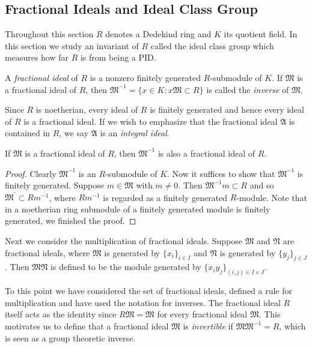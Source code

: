 \subsection{Fractional Ideals and Ideal Class Group}
Throughout this section $R$ denotes a Dedekind ring and $K$ its quotient field. In this section we study an invariant of $R$ called the ideal class group which measures how far $R$ is from being a PID.
\begin{definition}
A \textit{fractional ideal} of $R$ is a nonzero finitely generated $R$-submodule of $K$. If $\mathfrak{M}$ is a fractional ideal of $R$, then $\mathfrak{M}^{-1}=\{x\in K:x\mathfrak{M}\subset R\}$ is called the \textit{inverse} of $\mathfrak{M}$.
\end{definition}
Since $R$ is noetherian, every ideal of $R$ is finitely generated and hence every ideal of $R$ is a fractional ideal. If we wish to emphasize that the fractional ideal $\mathfrak{A}$ is contained in $R$, we say $\mathfrak{A}$ is an \textit{integral ideal}.
\begin{proposition}
If $\mathfrak{M}$ is a fractional ideal of $R$, then $\mathfrak{M}^{-1}$ is also a fractional ideal of $R$.
\end{proposition}
\begin{proof}
Clearly $\mathfrak{M}^{-1}$ is an $R$-submodule of $K$. Now it suffices to show that $\mathfrak{M}^{-1}$ is finitely generated. Suppose $m\in\mathfrak{M}$ with $m\ne 0$. Then $\mathfrak{M}^{-1}m\subset R$ and so $\mathfrak{M}^\prime\subset Rm^{-1}$, where $Rm^{-1}$ is regarded as a finitely generated $R$-module. Note that in a noetherian ring submodule of a finitely generated module is finitely generated, we finished the proof.
\end{proof}
Next we consider the multiplication of fractional ideals. Suppose $\mathfrak{M}$ and $\mathfrak{N}$ are fractional ideals, where $\mathfrak{M}$ is generated by $\{x_i\}_{i\in I}$ and $\mathfrak{N}$ is generated by $\{y_j\}_{j\in J}$. Then $\mathfrak{MN}$ is defined to be the module generated by $\{x_iy_j\}_{(i,j)\in I\times J}$.\par
To this point we have considered the set of fractional ideals, defined a rule for multiplication and have used the notation for inverses. The fractional ideal $R$ itself acts as the identity since $R\mathfrak{M}=\mathfrak{M}$ for every fractional ideal $\mathfrak{M}$. This motivates us to define that a fractional ideal $\mathfrak{M}$ is \textit{invertible} if $\mathfrak{M}\mathfrak{M}^{-1}=R$, which is seen as a group theoretic inverse.\par
